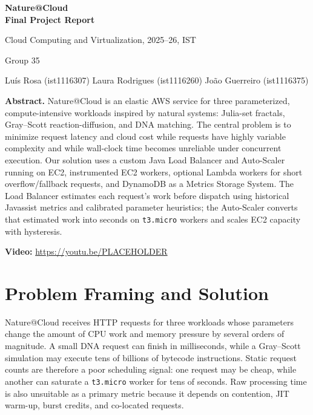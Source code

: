 \documentclass[10pt]{article}
\begin{document}
\begin{titlepage}
\thispagestyle{empty}
\centering
\vspace*{1.6cm}
{\LARGE\bfseries Nature@Cloud\\[3pt]Final Project Report\par}
\vspace{0.6cm}
{\large Cloud Computing and Virtualization, 2025--26, IST\par}
\vspace{0.35cm}
{\normalsize Group 35\par}
\vspace{0.35cm}
{\normalsize
Lu\'is Rosa (ist1116307)\quad
Laura Rodrigues (ist1116260)\quad
Jo\~ao Guerreiro (ist1116375)\par}
\vfill
\begin{minipage}{0.86\textwidth}
\textbf{Abstract.}
Nature@Cloud is an elastic AWS service for three parameterized, compute-intensive workloads inspired by natural systems: Julia-set fractals, Gray--Scott reaction-diffusion, and DNA matching. The central problem is to minimize request latency and cloud cost while requests have highly variable complexity and while wall-clock time becomes unreliable under concurrent execution. Our solution uses a custom Java Load Balancer and Auto-Scaler running on EC2, instrumented EC2 workers, optional Lambda workers for short overflow/fallback requests, and DynamoDB as a Metrics Storage System. The Load Balancer estimates each request's work before dispatch using historical Javassist metrics and calibrated parameter heuristics; the Auto-Scaler converts that estimated work into seconds on \texttt{t3.micro} workers and scales EC2 capacity with hysteresis.
\end{minipage}
\vfill
\textbf{Video:} \url{https://youtu.be/PLACEHOLDER}
\end{titlepage}

\clearpage
\setcounter{page}{1}
\twocolumn

\section{Problem Framing and Solution}

Nature@Cloud receives HTTP requests for three workloads whose parameters change the amount of CPU work and memory pressure by several orders of magnitude. A small DNA request can finish in milliseconds, while a Gray--Scott simulation may execute tens of billions of bytecode instructions. Static request counts are therefore a poor scheduling signal: one request may be cheap, while another can saturate a \texttt{t3.micro} worker for tens of seconds. Raw processing time is also unsuitable as a primary metric because it depends on contention, JIT warm-up, burst credits, and co-located requests.
\end{document}
